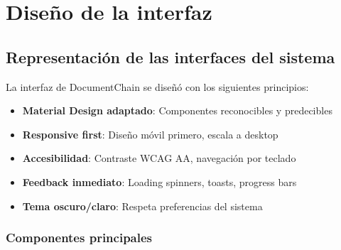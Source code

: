 \documentclass[11pt, a4paper]{article}
\begin{document}
\section{Diseño de la interfaz}

\subsection{Representación de las interfaces del sistema}

La interfaz de DocumentChain se diseñó con los siguientes principios:

\begin{itemize}
    \item \textbf{Material Design adaptado}: Componentes reconocibles y predecibles
    \item \textbf{Responsive first}: Diseño móvil primero, escala a desktop
    \item \textbf{Accesibilidad}: Contraste WCAG AA, navegación por teclado
    \item \textbf{Feedback inmediato}: Loading spinners, toasts, progress bars
    \item \textbf{Tema oscuro/claro}: Respeta preferencias del sistema
\end{itemize}

\subsubsection{Componentes principales}
\end{document}
